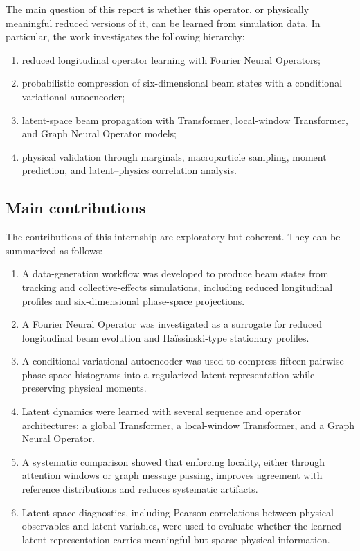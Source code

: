 \documentclass[11pt,a4paper]{article}
\begin{document}
\begin{sloppypar}
The main question of this report is whether this operator, or physically meaningful reduced versions of it, can be learned from simulation data. In particular, the work investigates the following hierarchy:
\begin{enumerate}[label=(\roman*)]
    \item reduced longitudinal operator learning with Fourier Neural Operators;
    \item probabilistic compression of six-dimensional beam states with a conditional variational autoencoder;
    \item latent-space beam propagation with Transformer, local-window Transformer, and Graph Neural Operator models;
    \item physical validation through marginals, macroparticle sampling, moment prediction, and latent--physics correlation analysis.
\end{enumerate}

\subsection{Main contributions}
The contributions of this internship are exploratory but coherent. They can be summarized as follows:
\begin{enumerate}[label=(\arabic*)]
    \item A data-generation workflow was developed to produce beam states from tracking and collective-effects simulations, including reduced longitudinal profiles and six-dimensional phase-space projections.
    \item A Fourier Neural Operator was investigated as a surrogate for reduced longitudinal beam evolution and Ha\"issinski-type stationary profiles.
    \item A conditional variational autoencoder was used to compress fifteen pairwise phase-space histograms into a regularized latent representation while preserving physical moments.
    \item Latent dynamics were learned with several sequence and operator architectures: a global Transformer, a local-window Transformer, and a Graph Neural Operator.
    \item A systematic comparison showed that enforcing locality, either through attention windows or graph message passing, improves agreement with reference distributions and reduces systematic artifacts.
    \item Latent-space diagnostics, including Pearson correlations between physical observables and latent variables, were used to evaluate whether the learned latent representation carries meaningful but sparse physical information.
\end{enumerate}


\end{sloppypar}
\end{document}

